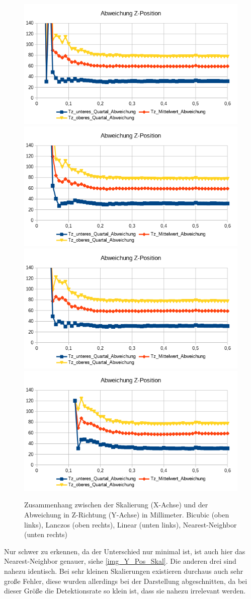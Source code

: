 \begin{figure}
	\centering
	\includegraphics[width=0.45\linewidth]{tabelle2/Z_Pos_Cubic}
	\includegraphics[width=0.45\linewidth]{tabelle2/Z_Pos_Lanc}
	\includegraphics[width=0.45\linewidth]{tabelle2/Z_Pos_Linear}
	\includegraphics[width=0.45\linewidth]{tabelle2/Z_Pos_NN}
	\caption{Zusammenhang zwischen der Skalierung (X-Achse) und der Abweichung in Z-Richtung (Y-Achse) in Millimeter. 
		Bicubic (oben links), Lanczos (oben rechts), Linear (unten links), Nearest-Neighbor (unten rechts)}
	\label{img_Z_Pos_Skal}
\end{figure}
Nur schwer zu erkennen, da der Unterschied nur minimal ist, ist auch hier das  Nearest-Neighbor  genauer, siehe \autoref{img_Y_Pos_Skal}. Die anderen drei sind nahezu identisch. Bei sehr kleinen Skalierungen existieren durchaus auch sehr große Fehler, diese wurden allerdings bei der Darstellung abgeschnitten, da bei dieser Größe die Detektionsrate so klein ist, dass sie nahezu irrelevant werden.
